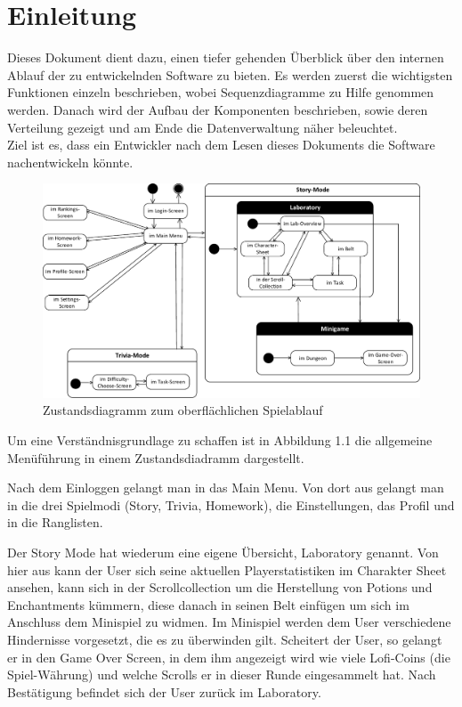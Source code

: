 
\chapter{Einleitung}
Dieses Dokument dient dazu, einen tiefer gehenden Überblick über den internen Ablauf der zu entwickelnden Software zu bieten. Es werden zuerst die wichtigsten Funktionen einzeln beschrieben, wobei Sequenzdiagramme zu Hilfe genommen werden. Danach wird der Aufbau der Komponenten beschrieben, sowie deren Verteilung gezeigt und am Ende die Datenverwaltung näher beleuchtet. \\
Ziel ist es, dass ein Entwickler nach dem Lesen dieses Dokuments die Software nachentwickeln könnte.

\begin{figure}[h]
\includegraphics[width=1.0\textwidth]{figures/statechart_game.pdf}
\caption{Zustandsdiagramm zum oberflächlichen Spielablauf}
\label{state_game}
\end{figure}


Um eine Verständnisgrundlage zu schaffen ist in Abbildung 1.1 die allgemeine Men\"uf\"uhrung in einem Zustandsdiadramm dargestellt. 


Nach dem Einloggen gelangt man in das Main Menu. Von dort aus gelangt man in die drei Spielmodi (Story, Trivia, Homework), die Einstellungen, das Profil und in die Ranglisten.

Der Story Mode hat wiederum eine eigene Übersicht, Laboratory genannt. Von hier aus kann der User sich seine aktuellen Playerstatistiken im Charakter Sheet ansehen, kann sich in der Scrollcollection um die Herstellung von Potions und Enchantments k\"ummern, diese danach in seinen Belt einf\"ugen um sich im Anschluss dem Minispiel zu widmen. Im Minispiel werden dem User verschiedene Hindernisse vorgesetzt, die es zu überwinden gilt. Scheitert der User, so gelangt er in den Game Over Screen, in dem ihm angezeigt wird wie viele Lofi-Coins (die Spiel-Währung) und welche Scrolls er in dieser Runde eingesammelt hat. Nach Bestätigung befindet sich der User zurück im Laboratory.

